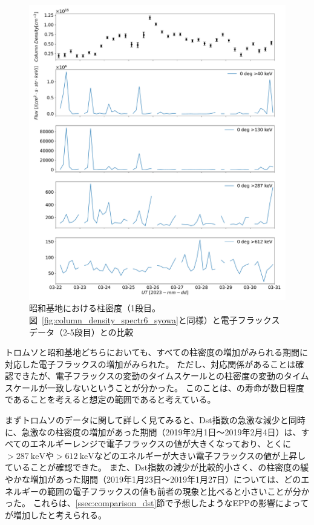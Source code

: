 \begin{figure}[htbp]
    \centering
    \includegraphics[width=\linewidth]{master_thesis_contents/master_thesis_fig/column_density_spectr6_poes0deg_syowa.pdf}
    \caption{昭和基地における柱密度（1段目。図~\ref{fig:column_density_spectr6_syowa}と同様）と電子フラックスデータ（2-5段目）との比較}
    \label{fig:poes_mmcd_syowa}
\end{figure} \par

トロムソと昭和基地どちらにおいても、すべての柱密度の増加がみられる期間に対応した電子フラックスの増加がみられた。
ただし、対応関係があることは確認できたが、電子フラックスの変動のタイムスケールとの柱密度の変動のタイムスケールが一致しないということが分かった。
このことは、の寿命が数日程度であることを考えると想定の範囲であると考えている。\par

まずトロムソのデータに関して詳しく見てみると、Dst指数の急激な減少と同時に、急激なの柱密度の増加があった期間（2019年2月1日〜2019年2月4日）は、すべてのエネルギーレンジで電子フラックスの値が大きくなっており、とくに$>287\ \mathrm{keV}$や$>612\ \mathrm{keV}$などのエネルギーが大きい電子フラックスの値が上昇していることが確認できた。
また、Dst指数の減少が比較的小さく、の柱密度の緩やかな増加があった期間（2019年1月23日〜2019年1月27日）については、どのエネルギーの範囲の電子フラックスの値も前者の現象と比べると小さいことが分かった。
これらは、\ref{ssec:comparison_dst}節で予想したようなEPPの影響によってが増加したと考えられる。\par

